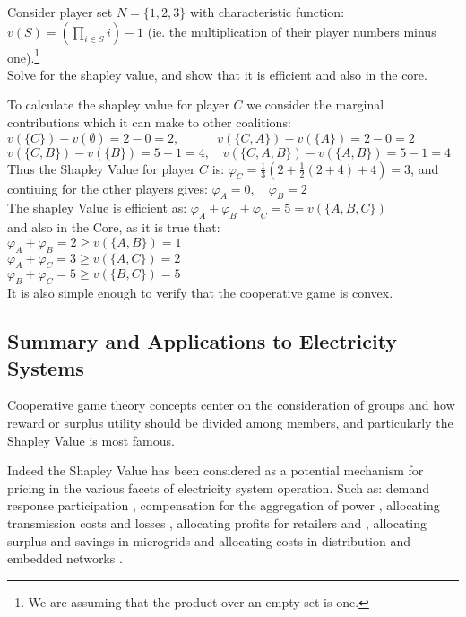 \begin{example}
Consider player set $N=\{1,2,3\}$ with characteristic function:\\
$v(S)=\left(\prod_{i\in S}i\right)-1$ (ie. the multiplication of their player numbers minus one).\footnote{We are assuming that the product over an empty set is one.}\\
Solve for the shapley value, and show that it is efficient and also in the core.
\end{example}

\begin{solution}
To calculate the shapley value for player $C$ we consider the marginal contributions which it can make to other coalitions:\\
$ v(\{C\})-v(\emptyset) = 2-0 = 2, \quad\quad\quad v(\{C,A\})-v(\{A\}) = 2-0 = 2$\\
$ v(\{C,B\})-v(\{B\}) = 5-1 = 4, \quad v(\{C,A,B\})-v(\{A,B\}) = 5-1 = 4  $\\
Thus the Shapley Value for player $C$ is:
$\varphi_C = \frac{1}{3}\left(2 + \frac{1}{2}(2+4) + 4\right) = 3$, and contiuing for the other players gives:
$\varphi_A = 0,\quad\varphi_B = 2$\\
The shapley Value is efficient as: $\varphi_A+\varphi_B+\varphi_C = 5 = v(\{A,B,C\})$\\
and also in the Core, as it is true that:\\
$\varphi_A+\varphi_B=2\ge v(\{A,B\})=1$\\
$\varphi_A+\varphi_C=3\ge v(\{A,C\})=2$\\
$\varphi_B+\varphi_C=5\ge v(\{B,C\})=5$\\
It is also simple enough to verify that the cooperative game is convex.

\end{solution}

\subsection{Summary and Applications to Electricity Systems}

Cooperative game theory concepts center on the consideration of groups and how reward or surplus utility should be divided among members, and particularly the Shapley Value is most famous.

Indeed the Shapley Value has been considered as a potential mechanism for pricing in the various facets of electricity system operation.
Such as: demand response participation \cite{DBLP:journals/tsg/OBrienGR15,electronics8010048,WANG201972}, compensation for the aggregation of power \cite{Perez-Diaz:2018:CEV:3237383.3237484,6520960}, allocating transmission costs and losses \cite{ip-gtd_20020005,SHARMA201733}, allocating profits for retailers and \cite{ACUNA2018161,WANG201972}, allocating surplus and savings in microgrids \cite{WU2017384} and allocating costs in distribution and embedded networks \cite{archie_paper1,8226810,10.1007/978-3-642-40776-5_19,6840296,DBLP:journals/corr/abs-1903-10965,AzuatalamCV_PowerTech2019}.

